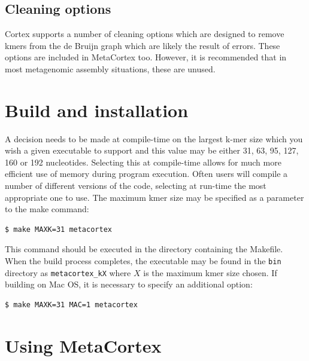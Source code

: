 \documentclass[a4paper,11pt,oneside]{article}
\begin{document}
\subsection{Cleaning options}

Cortex supports a number of cleaning options which are designed to remove kmers from the de Bruijn graph which are likely the result of errors. These options are included in MetaCortex too. However, it is recommended that in most metagenomic assembly situations, these are unused.

\section{Build and installation}

A decision needs to be made at compile-time on the largest k-mer size which you wish a given executable to support and this value may be either 31, 63, 95, 127, 160 or 192 nucleotides. Selecting this at compile-time allows for much more efficient use of memory during program execution. Often users will compile a number of different versions of the code, selecting at run-time the most appropriate one to use. The maximum kmer size may be specified as a parameter to the make command:
\vspace{6pt}
 \begin{verbatim}
$ make MAXK=31 metacortex
 \end{verbatim}
\vspace{-6pt}
 
\noindent{}This command should be executed in the directory containing the Makefile. When the build process completes, the executable may be found in the \verb|bin| directory as \verb|metacortex_kX| where $X$ is the maximum kmer size chosen. If building on Mac OS, it is necessary to specify an additional option:
\vspace{6pt}
 \begin{verbatim}
$ make MAXK=31 MAC=1 metacortex
 \end{verbatim}
\vspace{-6pt}

\section{Using MetaCortex}
\end{document}
